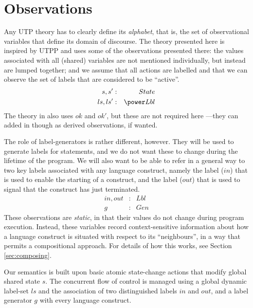 \section{Observations}\label{sec:observe}

Any UTP theory has to clearly define its \emph{alphabet},
that is, the set of observational variables that define
its domain of discourse.
The theory presented here is inspired by UTPP\cite{DBLP:conf/icfem/WoodcockH02}
and uses some of the observations presented there:
the values associated with all (shared) variables
are not mentioned individually, but instead are lumped together;
and we assume that all actions are labelled and that we can observe
the set of labels that are considered to be ``active''.
\begin{eqnarray}
   s, s' &:& State
\\ ls, ls' &:& \power Lbl
\end{eqnarray}
The theory in \cite{DBLP:conf/icfem/WoodcockH02} also uses $ok$ and $ok'$,
but these are not required here
---they can added in though as derived observations, if wanted.

The role of label-generators is rather different, however.
They will be used to generate labels for statements,
and we do not want these to change during the lifetime of the program.
We will also want to be able to refer in a general way to two key labels
associated with any language construct,
namely the label ($in$) that is used to enable the starting of a construct,
and the label ($out$) that is used to signal that the construct has just terminated.
\begin{eqnarray}
   in, out &:& Lbl
\\ g &:& Gen
\end{eqnarray}
These observations are \emph{static},
in that their values do not change during program execution.
Instead, these variables record context-sensitive information about
how a language construct is situated with respect to its ``neighbours'',
in a way that permits a compositional approach.
For details of how this works, see Section \ref{sec:composing}.



Our semantics is built upon basic atomic state-change
actions that modify global shared state $s$.
The concurrent flow of control is managed using a global dynamic label-set $ls$
and the association of two distinguished labels $in$ and $out$,
and a label generator $g$ with every language construct.

